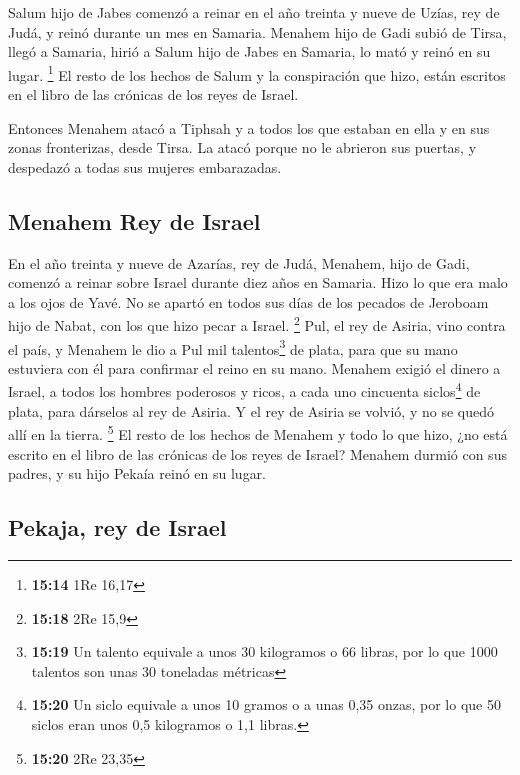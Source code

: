 \begin{paracol}{2}
 Salum hijo de Jabes comenzó a reinar en el año treinta y
nueve de Uzías, rey de Judá, y reinó durante un mes en Samaria.
 Menahem hijo de Gadi subió de Tirsa, llegó a Samaria,
hirió a Salum hijo de Jabes en Samaria, lo mató y reinó en su lugar.
\footnote{\textbf{15:14} 1Re 16,17}  El resto de los
hechos de Salum y la conspiración que hizo, están escritos en el libro
de las crónicas de los reyes de Israel.

 Entonces Menahem atacó a Tiphsah y a todos los que
estaban en ella y en sus zonas fronterizas, desde Tirsa. La atacó porque
no le abrieron sus puertas, y despedazó a todas sus mujeres embarazadas.

\hypertarget{menahem-rey-de-israel}{%
\subsection{Menahem Rey de Israel}\label{menahem-rey-de-israel}}

 En el año treinta y nueve de Azarías, rey de Judá,
Menahem, hijo de Gadi, comenzó a reinar sobre Israel durante diez años
en Samaria.  Hizo lo que era malo a los ojos de Yavé. No
se apartó en todos sus días de los pecados de Jeroboam hijo de Nabat,
con los que hizo pecar a Israel. \footnote{\textbf{15:18} 2Re 15,9}
 Pul, el rey de Asiria, vino contra el país, y Menahem le
dio a Pul mil talentos\footnote{\textbf{15:19} Un talento equivale a
  unos 30 kilogramos o 66 libras, por lo que 1000 talentos son unas 30
  toneladas métricas} de plata, para que su mano estuviera con él para
confirmar el reino en su mano.  Menahem exigió el dinero
a Israel, a todos los hombres poderosos y ricos, a cada uno cincuenta
siclos\footnote{\textbf{15:20} Un siclo equivale a unos 10 gramos o a
  unas 0,35 onzas, por lo que 50 siclos eran unos 0,5 kilogramos o 1,1
  libras.} de plata, para dárselos al rey de Asiria. Y el rey de Asiria
se volvió, y no se quedó allí en la tierra. \footnote{\textbf{15:20} 2Re
  23,35}  El resto de los hechos de Menahem y todo lo que
hizo, ¿no está escrito en el libro de las crónicas de los reyes de
Israel?  Menahem durmió con sus padres, y su hijo Pekaía
reinó en su lugar.

\hypertarget{pekaja-rey-de-israel}{%
\subsection{Pekaja, rey de Israel}\label{pekaja-rey-de-israel}}


\end{paracol}
